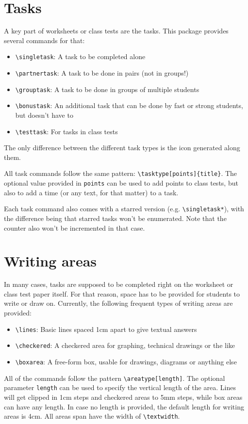 \documentclass[11pt, a4paper, oneside]{article}
\begin{document}
	\section*{Tasks} 
	
	A key part of worksheets or class tests are the tasks.
	This package provides several commands for that:
	\begin{itemize}[label=]
		\item \texttt{\textbackslash singletask}: A task to be completed alone
		\item \texttt{\textbackslash partnertask}: A task to be done in pairs (not in groups!)
		\item \texttt{\textbackslash grouptask}: A task to be done in groups of multiple students
		\item \texttt{\textbackslash bonustask}: An additional task that can be done by fast or strong students, but doesn't have to
		\item \texttt{\textbackslash testtask}: For tasks in class tests
	\end{itemize}
	The only difference between the different task types is the icon generated along them.
	
	All task commands follow the same pattern: \texttt{\textbackslash tasktype[points]\{title\}}.
	The optional value provided in \texttt{points} can be used to add points to class tests, but also to add a time (or any text, for that matter) to a task.
	
	Each task command also comes with a starred version (e.g. \texttt{\textbackslash singletask*}), with the difference being that starred tasks won't be enumerated.
	Note that the counter also won't be incremented in that case.
	
	\section*{Writing areas}
	
	In many cases, tasks are supposed to be completed right on the worksheet or class test  paper itself.
	For that reason, space has to be provided for students to write or draw on.
	Currently, the following frequent types of writing areas are provided:
	\begin{itemize}[label=]
		\item \texttt{\textbackslash lines}: Basic lines spaced 1cm apart to give textual answers
		\item \texttt{\textbackslash checkered}: A checkered area for graphing, technical drawings or the like
		\item \texttt{\textbackslash boxarea}: A free-form box, usable for drawings, diagrams or anything else
	\end{itemize}
	All of the commands follow the pattern \texttt{\textbackslash areatype[length]}.
	The optional parameter \texttt{length} can be used to specify the vertical length of the area.
	Lines will get clipped in 1cm steps and checkered areas to 5mm steps, while box areas can have any length.
	In case no length is provided, the default length for writing areas is 4cm.
	All areas span have the width of \texttt{\textbackslash textwidth}.
	
\end{document}
